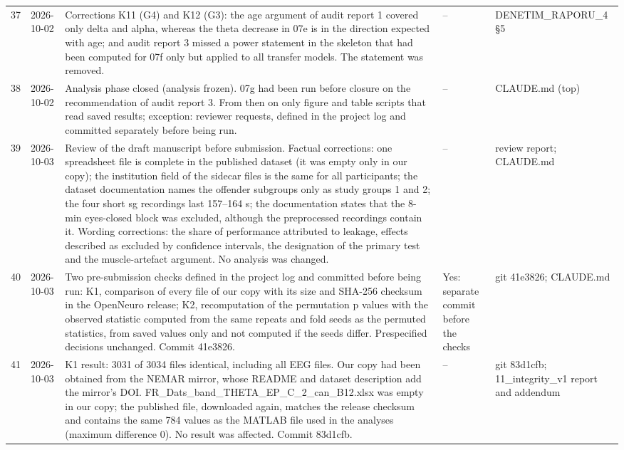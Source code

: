 \begin{longtable}{@{}p{0.6cm}p{1.9cm}p{6.8cm}p{2.8cm}p{2.3cm}@{}}
37 & \raggedright 2026-10-02 & Corrections K11 (G4) and K12 (G3): the age argument of audit report 1 covered only delta and alpha, whereas the theta decrease in 07e is in the direction expected with age; and audit report 3 missed a power statement in the skeleton that had been computed for 07f only but applied to all transfer models. The statement was removed. & \raggedright -- & \raggedright DENETIM\_\allowbreak{}RAPORU\_\allowbreak{}4 \S{}5 \tabularnewline
38 & \raggedright 2026-10-02 & Analysis phase closed (analysis frozen). 07g had been run before closure on the recommendation of audit report 3. From then on only figure and table scripts that read saved results; exception: reviewer requests, defined in the project log and committed separately before being run. & \raggedright -- & \raggedright CLAUDE.md (top) \tabularnewline
39 & \raggedright 2026-10-03 & Review of the draft manuscript before submission. Factual corrections: one spreadsheet file is complete in the published dataset (it was empty only in our copy); the institution field of the sidecar files is the same for all participants; the dataset documentation names the offender subgroups only as study groups 1 and 2; the four short sg recordings last 157--164 s; the documentation states that the 8-min eyes-closed block was excluded, although the preprocessed recordings contain it. Wording corrections: the share of performance attributed to leakage, effects described as excluded by confidence intervals, the designation of the primary test and the muscle-artefact argument. No analysis was changed. & \raggedright -- & \raggedright review report; CLAUDE.md \tabularnewline
40 & \raggedright 2026-10-03 & Two pre-submission checks defined in the project log and committed before being run: K1, comparison of every file of our copy with its size and SHA-256 checksum in the OpenNeuro release; K2, recomputation of the permutation p values with the observed statistic computed from the same repeats and fold seeds as the permuted statistics, from saved values only and not computed if the seeds differ. Prespecified decisions unchanged. Commit 41e3826. & \raggedright Yes: separate commit before the checks & \raggedright git 41e3826; CLAUDE.md \tabularnewline
41 & \raggedright 2026-10-03 & K1 result: 3031 of 3034 files identical, including all EEG files. Our copy had been obtained from the NEMAR mirror, whose README and dataset description add the mirror's DOI. FR\_\allowbreak{}Dats\_\allowbreak{}band\_\allowbreak{}THETA\_\allowbreak{}EP\_\allowbreak{}C\_\allowbreak{}2\_\allowbreak{}can\_\allowbreak{}B12.xlsx was empty in our copy; the published file, downloaded again, matches the release checksum and contains the same 784 values as the MATLAB file used in the analyses (maximum difference 0). No result was affected. Commit 83d1cfb. & \raggedright -- & \raggedright git 83d1cfb; 11\_\allowbreak{}integrity\_\allowbreak{}v1 report and addendum \tabularnewline

\end{longtable}
